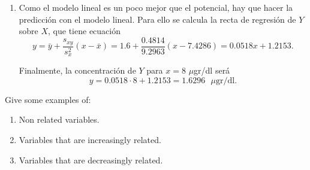 {\begin{enumerate}
Y el coeficiente de determinación potencial vale:
\begin{align*}
\bar u &= \frac{\sum u_i}{n} = \frac{0.7419+\cdots+2.2192}{7} = \frac{13.1955}{7} = 1.8851 \text{ $\ln(\mu$gr/dl)},\\
s_u^2 &= \frac{\sum u_i^2}{n}-\bar u^2 = \frac{0.7419^2+\cdots+2.2192^2}{7} -1.8851^2= \frac{26.9397}{7}-3.5536 = 0.295 \text{ $\ln^2(\mu$gr/dl)},\\
\bar v &= \frac{\sum v_j}{n} = \frac{0.2624+\cdots+0.5306}{7} = \frac{3.253}{7} = 0.4647 \text{ $\ln(\mu$gr/dl)},\\
s_v^2 &= \frac{\sum v_j^2}{n}-\bar v^2 = \frac{0.2624^2+\cdots+0.5306^2}{7} -0.4647^2= \frac{1.5878}{7}-0.2159 = 0.0109 \text{ $\ln^2(\mu$gr/dl)},\\
s_{uv} &= \frac{\sum u_iv_j}{n}-\bar u\bar v = \frac{0.7419\cdot0.2624+\cdots+2.2192\cdot0.5306}{7}-1.8851\cdot0.4647 =\\
&= \frac{6.5224}{7}-0.876 = 0.0557 \text{ $\ln^2(\mu$gr/dl)},\\
r^2 &= \frac{s_{uv}^2}{s_u^2 s_v^2} = \frac{0.0557^2}{0.295\cdot 0.0109} = 0.9688.
\end{align*}

Así pues, el modelo potencial también es muy buen modelo para explicar la relación entre $Y$ y $X$ aunque es un poco mejor el lineal.

\item Como el modelo lineal es un poco mejor que el potencial, hay que hacer la predicción con el modelo lineal. Para ello se calcula la recta
de regresión de $Y$ sobre $X$, que tiene ecuación
\[
y = \bar y +\frac{s_{xy}}{s_x^2}(x-\bar x) = 1.6 + \frac{0.4814}{9.2963}(x-7.4286) = 0.0518x+1.2153.
\]

Finalmente, la concentración de $Y$ para $x=8$ $\mu$gr/dl será
\[
y = 0.0518\cdot 8+1.2153 = 1.6296 \text{ $\mu$gr/dl}.
\]
\end{enumerate}
}


{Give some examples of:
\begin{enumerate}
\item Non related variables.
\item Variables that are increasingly related.
\item Variables that are decreasingly related.
\end{enumerate}
}


